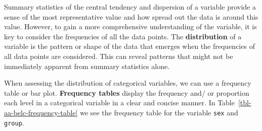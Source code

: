 \documentclass[
  letterpaper,
]{latex/krantz}
\theoremstyle{definition}
\theoremstyle{remark}
\begin{document}
Summary statistics of the central tendency and dispersion of a variable
provide a sense of the most representative value and how spread out the
data is around this value. However, to gain a more comprehensive
understanding of the variable, it is key to consider the frequencies of
all the data points. The \textbf{distribution} of a variable is the
pattern or shape of the data that emerges when the frequencies of all
data points are considered. This can reveal patterns that might not be
immediately apparent from summary statistics alone.

When assessing the distribution of categorical variables, we can use a
frequency table or bar plot. \textbf{Frequency tables} display the
frequency and/ or proportion each level in a categorical variable in a
clear and concise manner. In Table~\ref{tbl-aa-belc-frequency-table} we
see the frequency table for the variable \texttt{sex} and
\texttt{group}.

\begin{table}

\caption{\label{tbl-aa-belc-frequency-table}Frequency table for
variables in the BELC dataset}

\begin{minipage}{0.50\linewidth}



\end{minipage}%
%
\begin{minipage}{0.50\linewidth}



\end{minipage}%

\end{table}%
\end{document}
